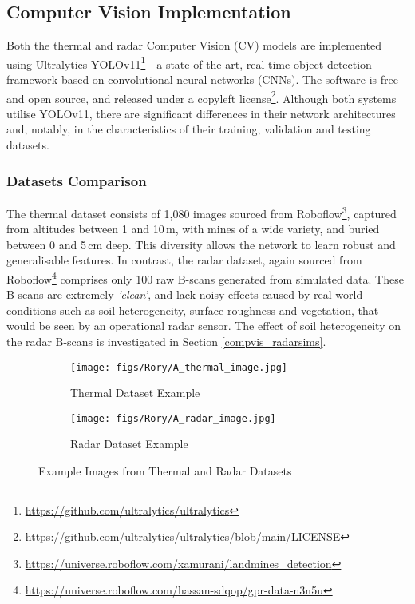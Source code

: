 \subsection{Computer Vision Implementation} \label{compvis_implementation}

    Both the thermal and radar Computer Vision (CV) models are implemented using Ultralytics YOLOv11\footnote{\url{https://github.com/ultralytics/ultralytics}}—a state-of-the-art, real-time object detection framework based on convolutional neural networks (CNNs). The software is free and open source, and released under a copyleft license\footnote{\url{https://github.com/ultralytics/ultralytics/blob/main/LICENSE}}. Although both systems utilise YOLOv11, there are significant differences in their network architectures and, notably, in the characteristics of their training, validation and testing datasets.


\subsubsection{Datasets Comparison} \label{sec:cv_dataset_comparison}

The thermal dataset consists of 1,080 images sourced from Roboflow\footnote{\url{https://universe.roboflow.com/xamurani/landmines_detection}}, captured from altitudes between 1 and 10\,m, with mines of a wide variety, and buried between 0 and 5\,cm deep. This diversity allows the network to learn robust and generalisable features. In contrast, the radar dataset, again sourced from Roboflow\footnote{\url{https://universe.roboflow.com/hassan-sdqop/gpr-data-n3n5u}} comprises only 100 raw B-scans generated from simulated data. These B-scans are extremely \textit{'clean'}, and lack noisy effects caused by real-world conditions such as soil heterogeneity, surface roughness and vegetation, that would be seen by an operational radar sensor. The effect of soil heterogeneity on the radar B-scans is investigated in Section \ref{compvis_radarsims}. 

\begin{figure}[htbp]
  \centering
  \begin{subfigure}[t]{0.48\textwidth}
    \centering
    \texttt{[image: figs/Rory/A\_thermal\_image.jpg]} %
    \caption{Thermal Dataset Example}
    \label{fig:thermal_example}
  \end{subfigure}
  \hfill
  \begin{subfigure}[t]{0.48\textwidth}
    \centering
    \texttt{[image: figs/Rory/A\_radar\_image.jpg]} %
    \caption{Radar Dataset Example}
    \label{fig:radar_example}
  \end{subfigure}
  \caption{Example Images from Thermal and Radar Datasets}
  \label{fig:dataset_examples}
\end{figure}

